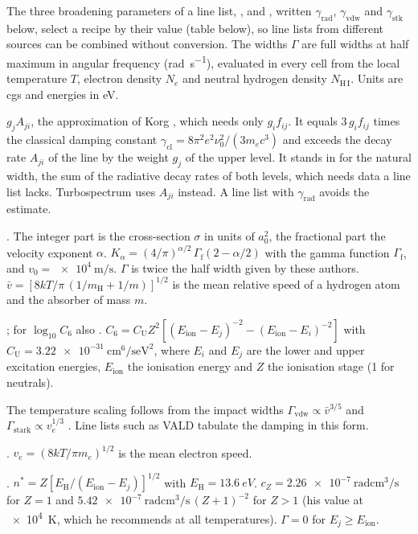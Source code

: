 \documentclass[paper=a4, fontsize=10pt]{scrartcl}
\numberwithin{equation}{section}		%
\numberwithin{figure}{section}			%
\numberwithin{table}{section}				%
\newcommand{\fort}[1]{\smash{\texttt{#1}}}
\begin{document}
The three broadening parameters of a line list, \fort{grad}, \fort{gvdw} and \fort{gstk}, written $\gamma_\mathrm{rad}$, $\gamma_\mathrm{vdw}$ and $\gamma_\mathrm{stk}$ below, select a recipe by their value (table below), so line lists from different sources can be combined without conversion. The widths $\Gamma$ are full widths at half maximum in angular frequency (\si{\radian\per\s}), evaluated in every cell from the local temperature $T$, electron density $N_e$ and neutral hydrogen density $N_\mathrm{H\,I}$. Units are cgs and energies in eV.



\begin{description}\small
    \item[a] $g_j A_{ji}$, the approximation of Korg \citep{WheelerAbruzzo2023}, which needs only $g_i f_{ij}$. It equals $3\,g_i f_{ij}$ times the classical damping constant $\gamma_\mathrm{cl}=8\pi^2e^2\nu_0^2/(3m_ec^3)$ and exceeds the decay rate $A_{ji}$ of the line by the weight $g_j$ of the upper level. It stands in for the natural width, the sum of the radiative decay rates of both levels, which needs data a line list lacks. Turbospectrum uses $A_{ji}$ instead. A line list with $\gamma_\mathrm{rad}$ avoids the estimate.
    \item[b] \citet{BarklemPiskunov2000}. The integer part is the cross-section $\sigma$ in units of $a_0^2$, the fractional part the velocity exponent $\alpha$. $K_\alpha=(4/\pi)^{\alpha/2}\,\Gamma_\mathrm{f}(2-\alpha/2)$ with the gamma function $\Gamma_\mathrm{f}$, and $v_0=\SI{e4}{\metre\per\s}$. $\Gamma$ is twice the half width given by these authors. $\bar v=[8kT/\pi\,(1/m_\mathrm{H}+1/m)]^{1/2}$ is the mean relative speed of a hydrogen atom and the absorber of mass $m$.
    \item[c] \citet{Unsold1955}; for $\log_{10}C_6$ also \citet{Gray2005}. $C_6=C_\mathrm{U}Z^2[(E_\mathrm{ion}-E_j)^{-2}-(E_\mathrm{ion}-E_i)^{-2}]$ with $C_\mathrm{U}=\SI{3.22e-31}{\centi\metre\tothe{6}\per\s\electronvolt\squared}$, where $E_i$ and $E_j$ are the lower and upper excitation energies, $E_\mathrm{ion}$ the ionisation energy and $Z$ the ionisation stage (1 for neutrals).
    \item[d] The temperature scaling follows from the impact widths $\Gamma_\mathrm{vdw}\propto\bar v^{3/5}$ and $\Gamma_\mathrm{stark}\propto v_e^{1/3}$ \citep{Unsold1955}. Line lists such as VALD \citep{RyabchikovaPiskunov2015} tabulate the damping in this form.
    \item[e] \citet{Unsold1955,Gray2005}. $v_e=(8kT/\pi m_e)^{1/2}$ is the mean electron speed.
    \item[f] \citet{Cowley1971}. $n^*=Z[E_\mathrm{H}/(E_\mathrm{ion}-E_j)]^{1/2}$ with $E_\mathrm{H}=\SI{13.6}{eV}$. $c_Z=\SI{2.26e-7}{\radian\centi\metre\cubed\per\s}$ for $Z=1$ and $\SI{5.42e-7}{\radian\centi\metre\cubed\per\s}\,(Z+1)^{-2}$ for $Z>1$ (his value at \SI{e4}{K}, which he recommends at all temperatures). $\Gamma=0$ for $E_j\ge E_\mathrm{ion}$.
\end{description}
\end{document}
